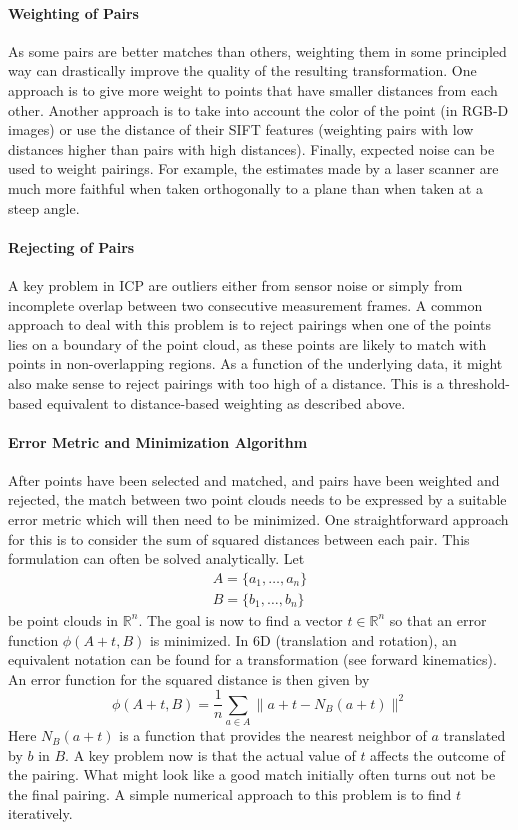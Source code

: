 \paragraph{Weighting of Pairs}
As some pairs are better matches than others, weighting them in some principled way can drastically improve the quality of the resulting transformation. One approach is to give more weight to points that have smaller distances from each other. Another approach is to take into account the color of the point (in RGB-D images) or use the distance of their SIFT features (weighting pairs with low distances higher than pairs with high distances). Finally, expected noise can be used to weight pairings. For example, the estimates made by a laser scanner are much more faithful when taken orthogonally to a plane than when taken at a steep angle.

\paragraph{Rejecting of Pairs}
A key problem in ICP are outliers either from sensor noise or simply from incomplete overlap between two consecutive measurement frames. A common approach to deal with this problem is to reject pairings when one of the points lies on a boundary of the point cloud, as these points are likely to match with points in non-overlapping regions. As a function of the underlying data, it might also make sense to reject pairings with too high of a distance. This is a threshold-based equivalent to distance-based weighting as described above.

\paragraph{Error Metric and Minimization Algorithm}
After points have been selected and matched, and pairs have been weighted and rejected, the match between two point clouds needs to be expressed by a suitable error metric which will then need to be minimized. One straightforward approach for this is to consider the sum of squared distances between each pair. This formulation can often be solved analytically. Let
\begin{eqnarray}
A=\{a_1,\ldots,a_n\}\\
B=\{b_1,\dots,b_n\}
\end{eqnarray}
be point clouds in $ \mathbb{R}^n$. The goal is now to find a vector $ t \in \mathbb{R}^n$ so that an error function $ \phi(A+t,B)$ is minimized. In 6D (translation and rotation), an equivalent notation can be found for a transformation (see forward kinematics). An error function for the squared distance is then given by
\begin{equation}
\phi(A+t,B)=\frac{1}{n}\sum_{a \in A}\|a+t-N_B(a+t)\|^2
\end{equation}
Here $ N_B(a+t)$ is a function that provides the nearest neighbor of $ a$ translated by $ b$ in $ B$.  A key problem now is that the actual value of $t$ affects the outcome of the pairing. What might look like a good match initially often turns out not be the final pairing. A simple numerical approach to this problem is to find $ t$ iteratively.

